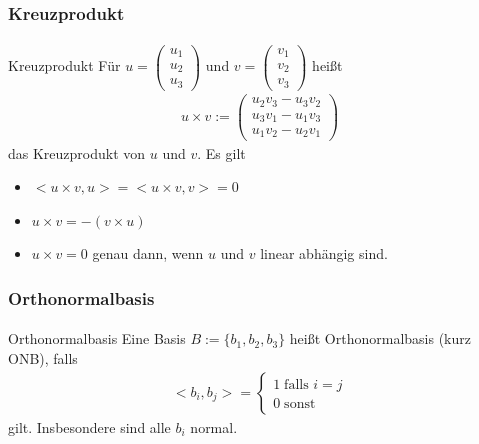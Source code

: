 \documentclass{beamer}
\begin{document}
\begin{frame}
    \frametitle{Kreuzprodukt}
\framesubtitle{}
\begin{block}{Kreuzprodukt}
Für $u = \begin{pmatrix} u_1 \\ u_2 \\ u_3 \end{pmatrix}$ und $v= \begin{pmatrix} v_1 \\ v_2 \\ v_3 \end{pmatrix}$ heißt
\begin{align*}
u \times v :=  \begin{pmatrix} u_2 v_3 - u_3v_2  \\ u_3 v_1 - u_1v_3 \\ u_1 v_2 - u_2 v_1\end{pmatrix} 
\end{align*}
das Kreuzprodukt von $u$ und $v$.
Es gilt
\begin{itemize}
\item $<u \times v, u> =  <u \times v, v> = 0$ 
\item $u \times v = - (v \times u)$
\item $u \times v = 0$ genau dann, wenn $u$ und $v$ linear abhängig sind.
\end{itemize}
\end{block}
\end{frame}

\begin{frame}
    \frametitle{Orthonormalbasis}
\framesubtitle{}
\begin{block}{Orthonormalbasis}
Eine Basis  $B:= \{ b_1, b_2 , b_3 \}$ heißt Orthonormalbasis (kurz ONB), falls 
\begin{align*}
<b_i, b_j> = \begin{cases}  1 \; \text{falls }  i = j  \\ 0 \; \text{sonst}\end{cases}
\end{align*}
gilt. Insbesondere sind alle $b_i$ normal.
\end{block}
\end{frame}
\end{document}
